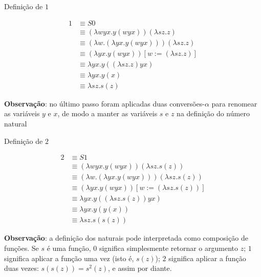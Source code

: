 \begin{frame}[fragile]{Definição de $1$}

    \begin{align*}
        1 &\equiv S0 \\
          &\equiv (\lambda wyx.y(wyx))(\lambda sz.z) \\
          &\equiv (\lambda w.(\lambda yx.y(wyx)))(\lambda sz.z) \\
          &\equiv (\lambda yx.y(wyx))[w:=(\lambda sz.z)] \\
          &\equiv \lambda yx.y((\lambda sz.z)yx) \\
          &\equiv \lambda yx.y(x) \\
          &\equiv \lambda sz.s(z)
    \end{align*}

    \vspace{0.1in}

    \textbf{Observação}: no último passo foram aplicadas duas conversões-$\alpha$ para renomear
        as variáveis $y$ e $x$, de modo a manter as variáveis $s$ e $z$ na definição do
        número natural
\end{frame}

\begin{frame}[fragile]{Definição de $2$}

    \begin{align*}
        2 &\equiv S1 \\
          &\equiv (\lambda wyx.y(wyx))(\lambda sz.s(z)) \\
          &\equiv (\lambda w.(\lambda yx.y(wyx)))(\lambda sz.s(z)) \\
          &\equiv (\lambda yx.y(wyx))[w:=(\lambda sz.s(z))] \\
          &\equiv \lambda yx.y((\lambda sz.s(z))yx) \\
          &\equiv \lambda yx.y(y(x)) \\
          &\equiv \lambda sz.s(s(z))
    \end{align*}

    \vspace{0.1in}

    \textbf{Observação}: a definição dos naturais pode interpretada como composição de funções.
        Se $s$ é uma função, $0$ significa simplesmente retornar o argumento $z$; $1$ 
        significa aplicar a função uma vez (isto é, $s(z)$); $2$ significa aplicar a função duas vezes:
        $s(s(z)) = s^2(z)$, e assim por diante. 
\end{frame}
